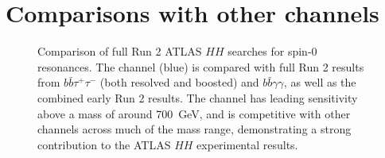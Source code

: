 \chapter{Comparisons with other channels}
\label{chap:compare}
\begin{figure}[ht]
\centering
{}

\caption{\label{fig:res-comparison} Comparison of full Run 2 ATLAS $HH$ searches for spin-0 resonances. The \bbbb 
channel (blue) is compared with full Run 2 results from $b\bar{b}\tau^{+}\tau^{-}$ (both resolved and boosted) and  
$b\bar{b}\gamma\gamma$, as well as the combined early Run 2 results. The \bbbb channel has leading sensitivity above 
a mass of around \SI{700}{\GeV}, and is competitive with other channels across much of the mass range, demonstrating 
a strong contribution to the ATLAS $HH$ experimental results.~\cite{ATL-PHYS-PUB-2021-031}}
\end{figure}

